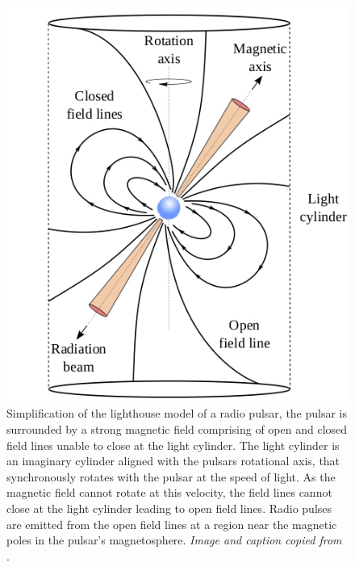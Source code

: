 \begin{figure}[!ht]
\centering
\includegraphics[scale=0.4]{figures/fig-1}
\caption[Lighthouse model of a radio pulsar]{Simplification of the lighthouse model of a radio pulsar, the pulsar is surrounded by a strong magnetic field comprising of open and closed field lines unable to close at the light cylinder. The light cylinder is an imaginary cylinder aligned with the pulsars rotational axis, that synchronously rotates with the pulsar at the speed of light. As the magnetic field cannot rotate at this velocity, the field lines cannot close at the light cylinder leading to open field lines. Radio pulses are emitted from the open field lines at a region near the magnetic poles in the pulsar’s magnetosphere. \textit{Image and caption copied from} \citep{lyon}.}	
\label{fig:fig-1}
\end{figure}

